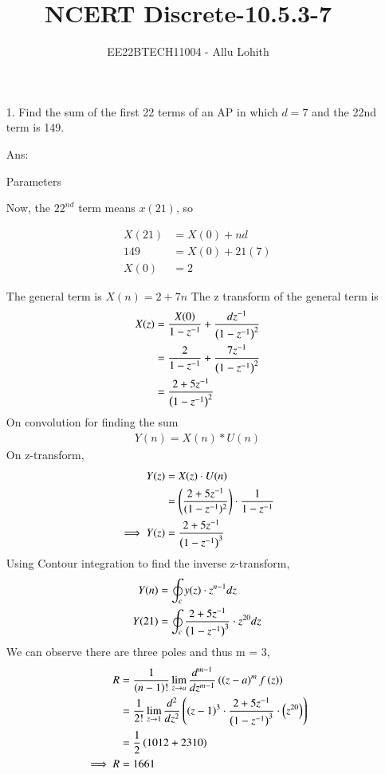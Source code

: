 \documentclass[journal,12pt,twocolumn]{IEEEtran}
\theoremstyle{remark}
\begin{document}

\vspace{3cm}

\title{NCERT Discrete-10.5.3-7}
\author{EE22BTECH11004 - Allu Lohith}

\maketitle
\newpage
\bigskip

\renewcommand{\thefigure}{\theenumi}
\renewcommand{\thetable}{\theenumi}
\begin{enumerate}
\item[1.]
Find the sum of the first 22 terms of an AP in which $d = 7$ and the 22nd term is 149.
\item[Ans:]

\begin{table}[h!]
\centering

\vspace{0.5cm}
\caption{\normalsize Parameters}
\end{table}

Now, the $22^{nd}$ term means $x(21)$, so

\begin{align}
X(21) &= X(0)+nd\\
149 &= X(0)+21(7)\\
X(0) &= 2    
\end{align}

The general term is $X(n)=2+7n$
The z transform of the general term is 
\begin{align}
X(z)&= \frac{X(0)}{1-z^{-1}}+\frac{dz^{-1}}{\left(1-z^{-1}\right)^2} \\
&=\frac{2}{1-z^{-1}}+\frac{7z^{-1}}{{\left(1-z^{-1}\right)^2}}\\
&=\frac{2+5z^{-1}}{\left(1-z^{-1}\right)^2}
\end{align}
On convolution for finding the sum
\begin{align}
    Y(n)=X(n)\ast U(n)
\end{align}
On z-transform, 
\begin{align}
Y(z)&=X(z)\cdot U(n)\\
    &=\left(\frac{{2+5z^{-1}}}{{(1-z^{-1})^2}}\right) \cdot \frac{1}{{1-z^{-1}}}\\
  \implies Y(z)  &= \frac{2+5z^{-1}}{\left(1-z^{-1}\right)^3}
\end{align}
Using Contour integration to find the inverse z-transform,
\begin{align}
    Y(n)&=\oint_c y(z)\cdot z^{n-1}dz\\
    Y(21)&=\oint_c \frac{2+5z^{-1}}{\left(1-z^{-1}\right)^3}\cdot z^{20}dz
\end{align}
We can observe there are three poles and thus m = 3,
\begin{align}
    R&=\frac{1}{\left(n-1\right)!} \lim_{z \to a} \frac{d^{m-1}}{dz^{m-1}}\left(\left(z-a\right)^mf\left(z\right)\right)\\
    &=\frac{1}{2!}\lim_{z \to 1} \frac{d^2}{dz^2} \left(\left(z-1\right)^3\cdot \frac{2+5z^{-1}}{\left(1-z^{-1}\right)^3}\cdot \left(z^{20}\right)\right)\\
    &=\frac{1}{2}\left(1012+2310\right)\\
    \implies R&=1661
\end{align}


\end{enumerate}
\end{document}

